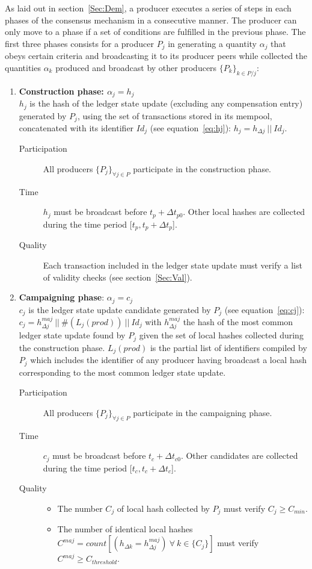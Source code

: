 As laid out in section~\ref{Sec:Dem}, a producer executes a series of steps in each phases of the consensus mechanism in a consecutive manner. The producer can only move to a phase if a set of conditions are fulfilled in the previous phase. The first three phases consists for a producer $P_j$  in generating a quantity $\alpha_j$ that obeys certain criteria and broadcasting it to its producer peers while collected the quantities $\alpha_k$ produced and broadcast by other producers $\{P_k\}_{k\in P/j}$:
\begin{enumerate}
\item \textbf{Construction phase: $\alpha_j = h_j$} \\
 $h_j$ is the hash of the ledger state update (excluding any compensation entry) generated by $P_j$, using the set of transactions stored in its mempool, concatenated with its identifier $Id_j$ (see equation~\ref{eq:hj}): $h_j = h_{\Delta j}~||~Id_j$. 
\begin{description}
\item[Participation] All producers $\{P_j\}_{\forall j \in P}$ participate in the construction phase. 
\item[Time] $h_j$ must be broadcast before $t_p + \Delta t_{p0}$. Other local hashes are collected during the time period [$t_p, t_p + \Delta t_{p}$].
\item[Quality] Each transaction included in the ledger state update must verify a list of validity checks (see section~\ref{Sec:Val}). 
\end{description}

\item \textbf{Campaigning phase}: $\alpha_j = c_j$\\
$c_j$ is the ledger state update candidate generated by $P_j$ (see equation~\ref{eq:cj}):\\
$c_j = h^{maj}_{\Delta j}~||~\#(L_j(prod))~||~Id_j$ with $h^{maj}_{\Delta j}$ the hash of the most common ledger state update found by $P_j$ given the set of local hashes collected during the construction phase. $L_j(prod)$ is the partial list of identifiers compiled by $P_j$ which includes the identifier of any producer having broadcast a local hash corresponding to the most common ledger state update.
\begin{description}
\item[Participation] All producers $\{P_j\}_{\forall j\in P}$ participate in the campaigning phase. 
\item[Time] $c_j$ must be broadcast before $t_c + \Delta t_{c0}$. Other candidates are collected during the time period [$t_c, t_c + \Delta t_{c}$].
\item[Quality] 
\begin{itemize}
\item The number $C_j$ of local hash collected by $P_j$ must verify $C_j \geq C_{min}$.
\item The number of identical local hashes $C^{maj} = count[(h_{\Delta k} = h^{maj}_{\Delta j})~\forall~k\in\{C_j\}]$ must verify $C^{maj} \geq C_{threshold}$.
\end{itemize}
\end{description}


\end{enumerate}
